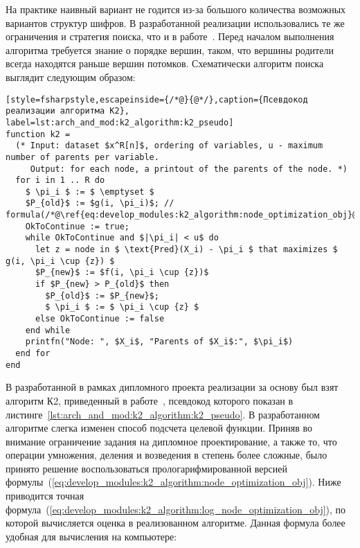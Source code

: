 На практике наивный вариант не годится из-за большого количества возможных вариантов структур шифров.
В разработанной реализации использовались те же ограничения и стратегия поиска, что и в работе~\cite{Cooper1991}.
Перед началом выполнения алгоритма требуется знание о порядке вершин, таком, что вершины родители всегда находятся раньше вершин потомков.
Схематически алгоритм поиска выглядит следующим образом:

\begin{lstlisting}[style=fsharpstyle,escapeinside={/*@}{@*/},caption={Псевдокод реализации алгоритма К2}, label=lst:arch_and_mod:k2_algorithm:k2_pseudo]
function k2 =
  (* Input: dataset $x^R[n]$, ordering of variables, u - maximum number of parents per variable.
     Output: for each node, a printout of the parents of the node. *)
  for i in 1 .. R do
    $ \pi_i $ := $ \emptyset $
    $P_{old}$ := $g(i, \pi_i)$; // formula(/*@\ref{eq:develop_modules:k2_algorithm:node_optimization_obj}@*/)
    OkToContinue := true;
    while OkToContinue and $|\pi_i| < u$ do
      let z = node in $ \text{Pred}(X_i) - \pi_i $ that maximizes $ g(i, \pi_i \cup {z}) $
      $P_{new}$ := $f(i, \pi_i \cup {z})$
      if $P_{new} > P_{old}$ then
        $P_{old}$ := $P_{new}$;
        $ \pi_i $ := $ \pi_i \cup {z} $
      else OkToContinue := false
    end while
    printfn("Node: ", $X_i$, "Parents of $X_i$:", $\pi_i$)
  end for
end
\end{lstlisting}

В разработанной в рамках дипломного проекта реализации за основу был взят алгоритм К2, приведенный в работе~\cite{Cooper1991}, псевдокод которого показан в листинге~\ref{lst:arch_and_mod:k2_algorithm:k2_pseudo}.
В разработанном алгоритме слегка изменен способ подсчета целевой функции.
Приняв во внимание ограничение задания на дипломное проектирование, а также то, что операции умножения, деления и возведения в степень более сложные, было принято решение воспользоваться прологарифмированной версией формулы~(\ref{eq:develop_modules:k2_algorithm:node_optimization_obj}).
Ниже приводится точная формула~(\ref{eq:develop_modules:k2_algorithm:log_node_optimization_obj}), по которой вычисляется оценка в реализованном алгоритме.
Данная формула более удобная для вычисления на компьютере:


